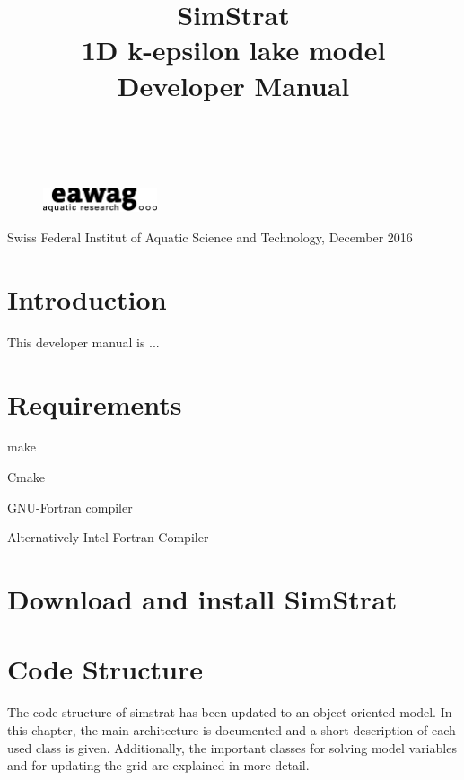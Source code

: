 \documentclass[paper=a4, fontsize=12pt]{article}
\title{\vspace{-15mm}\huge SimStrat \\ 1D k-epsilon lake model \\[0.5cm] \textbf{Developer Manual}} %
\author{
\large
{\textsc{}}\\[2mm]
}
\date{}
\begin{document}
\begin{titlepage}
	\maketitle %
	\thispagestyle{empty}
	\tableofcontents
	\vspace{5cm}
	\begin{figure}[h]
		\includegraphics[width=0.3\textwidth]{ealogo05-150.eps}
	\end{figure}

	\noindent{}\selectfont Swiss Federal Institut of Aquatic Science and Technology, December 2016
\end{titlepage}
\thispagestyle{fancy} %

\section{Introduction}
This developer manual is ...

\section{Requirements}

make

Cmake

GNU-Fortran compiler

Alternatively Intel Fortran Compiler

\section{Download and install SimStrat}

\newpage
\section{Code Structure}
The code structure of simstrat has been updated to an object-oriented model. In this chapter, the main architecture is documented and a short description of each used class is given. Additionally, the important classes for solving model variables and for updating the grid are explained in more detail.
\end{document}
